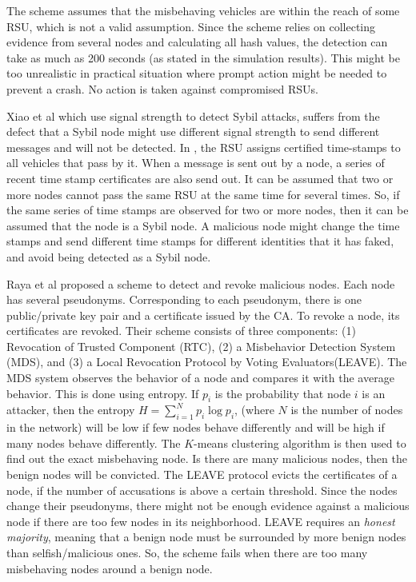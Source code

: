\documentclass[conference]{IEEEtran}[10pt]
\begin{document}
The scheme assumes that the misbehaving vehicles are within the reach of some RSU, which is not a 
valid assumption. Since the scheme relies on collecting evidence from several nodes and calculating all hash values, 
the detection can take as much as 200 seconds (as stated in the simulation results). 
This might be too unrealistic in practical situation where prompt action might be needed to prevent a crash. 
No action is taken against compromised RSUs. 

Xiao et al \cite{XYG06} which use signal strength to detect Sybil attacks, suffers from the defect that a Sybil node might use
different signal strength to send different messages and will not be detected. 
In \cite{PATZ09}, the RSU assigns certified time-stamps to all vehicles that pass by it. 
When a message is sent out by a node, a series of recent time stamp certificates are also send out. 
It can be assumed that  two or more nodes cannot  pass the same RSU at the same time for several times. 
So, if the same series of time stamps are observed for two or more nodes, then it can be assumed
that the node is a Sybil node. 
A malicious node might change the time stamps
and send different time stamps for different identities that it has faked, and avoid being detected as a Sybil node. 

Raya et al \cite{RPAJH07} proposed a scheme to detect and revoke malicious nodes. 
Each node has several pseudonyms. 
Corresponding to each pseudonym, there is one public/private key pair and a certificate issued by the CA. 
To revoke a node, its certificates are revoked. 
Their scheme consists of three components:
(1) Revocation of Trusted Component (RTC), 
(2) a Misbehavior Detection System (MDS), and
(3) a Local Revocation Protocol by Voting Evaluators(LEAVE).
The MDS system observes the behavior of a node and compares it with the average behavior. 
This is done using entropy. If $p_i$ is the probability that node $i$ is an attacker, then the entropy
$H = \sum_{i=1}^N p_i \log p_i$, (where $N$ is the number of nodes in the network) will be low if few nodes behave differently and will be high
if many nodes behave differently. 
The $K$-means clustering algorithm \cite{JMF99} is then used to find out the exact misbehaving node. 
Is there are many malicious nodes, then the benign nodes will be convicted. 
The LEAVE protocol evicts the certificates of a node, if the number of accusations is above a certain threshold. 
Since the nodes change their pseudonyms, there might not be enough evidence against a malicious node if there are too few nodes in its neighborhood. 
LEAVE requires an \emph{honest majority}, meaning that a benign node must be surrounded by more benign nodes than selfish/malicious ones. 
So, the scheme fails when there are too many misbehaving nodes around a benign node. 
\end{document}
